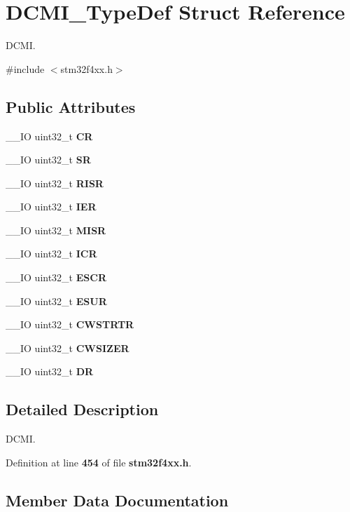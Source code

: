 \section{D\+C\+M\+I\+\_\+\+Type\+Def Struct Reference}
\label{structDCMI__TypeDef}


D\+C\+MI.  




{\ttfamily \#include $<$stm32f4xx.\+h$>$}

\subsection*{Public Attributes}
\begin{DoxyCompactItemize}
\item 
\+\_\+\+\_\+\+IO uint32\+\_\+t \textbf{ CR}
\item 
\+\_\+\+\_\+\+IO uint32\+\_\+t \textbf{ SR}
\item 
\+\_\+\+\_\+\+IO uint32\+\_\+t \textbf{ R\+I\+SR}
\item 
\+\_\+\+\_\+\+IO uint32\+\_\+t \textbf{ I\+ER}
\item 
\+\_\+\+\_\+\+IO uint32\+\_\+t \textbf{ M\+I\+SR}
\item 
\+\_\+\+\_\+\+IO uint32\+\_\+t \textbf{ I\+CR}
\item 
\+\_\+\+\_\+\+IO uint32\+\_\+t \textbf{ E\+S\+CR}
\item 
\+\_\+\+\_\+\+IO uint32\+\_\+t \textbf{ E\+S\+UR}
\item 
\+\_\+\+\_\+\+IO uint32\+\_\+t \textbf{ C\+W\+S\+T\+R\+TR}
\item 
\+\_\+\+\_\+\+IO uint32\+\_\+t \textbf{ C\+W\+S\+I\+Z\+ER}
\item 
\+\_\+\+\_\+\+IO uint32\+\_\+t \textbf{ DR}
\end{DoxyCompactItemize}


\subsection{Detailed Description}
D\+C\+MI. 

Definition at line \textbf{ 454} of file \textbf{ stm32f4xx.\+h}.



\subsection{Member Data Documentation}
\mbox{\label{structDCMI__TypeDef_ab40c89c59391aaa9d9a8ec011dd0907a}} 

